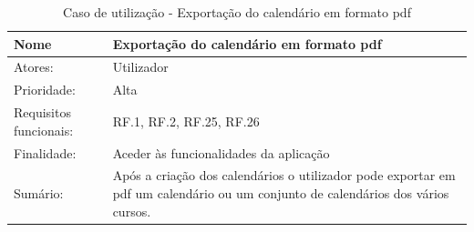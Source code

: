 \documentclass[11pt, twoside]{report}
\begin{document}
	\begin{table}[H]
		\caption{Caso de utilização - Exportação do calendário em formato pdf}
		\begin{center}	
			\begin{tabularx}{\textwidth}{|l|X|}
				\hline
				\textbf{Nome }              & \textbf{Exportação do calendário em formato pdf}                                                                                                                                                                                                                                                                 \\
				\hline
				Atores:                     & Utilizador                                                                                                                                                                                                                                                                                                          \\
				\hline
				Prioridade:                 & Alta                                                                                                                                                                                                                                                                                                                \\
				\hline
				Requisitos funcionais:      & RF.1, RF.2, RF.25, RF.26                                                                                                                                                                                                                                                                                            \\
				\hline
				Finalidade:                 & Aceder às funcionalidades da aplicação                                                                                                                                                                                                                                                                           \\
				\hline
				Sumário:                   & Após a criação dos calendários o utilizador pode exportar em pdf um calendário ou um conjunto de calendários dos vários cursos.                                                                                                                                                                              \\

\end{tabularx}
\end{center}
\end{table}
\end{document}
